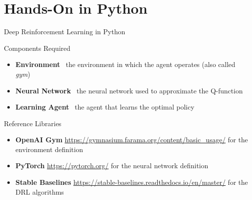 \documentclass[presentation, 9pt]{beamer}\mode<presentation>{\usetheme{AMSBolognaFC}}
\begin{document}
\section{Hands-On in Python}
\begin{frame}{Deep Reinforcement Learning in Python}
\begin{block}{Components Required}
	\begin{itemize}
		\item \textbf{Environment} \faArrowRight \, the environment in which the agent operates (also called \textit{gym})
		\item \textbf{Neural Network} \faArrowRight \, the neural network used to approximate the Q-function
		\item \textbf{Learning Agent} \faArrowRight \, the agent that learns the optimal policy
	\end{itemize}
\end{block}
\begin{block}{Reference Libraries}
	\begin{itemize}
		\item \textbf{OpenAI Gym} \url{https://gymnasium.farama.org/content/basic_usage/} \faArrowRight for the environment definition
		\item \textbf{PyTorch} \url{https://pytorch.org/} \faArrowRight for the neural network definition
		\item \textbf{Stable Baselines}  \url{https://stable-baselines.readthedocs.io/en/master/} \faArrowRight for the DRL algorithms
	\end{itemize}
\end{block}
\end{frame}
\end{document}

